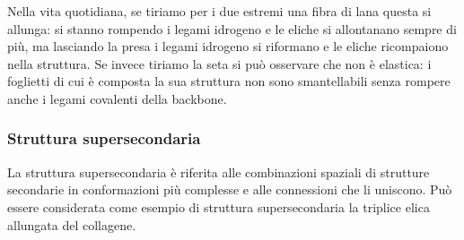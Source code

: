 {{\par Nella vita quotidiana, se tiriamo per i due estremi una fibra di lana questa si allunga: si stanno rompendo i legami idrogeno e le eliche si allontanano sempre di più, ma lasciando la presa i legami idrogeno si riformano e le eliche ricompaiono nella struttura. Se invece tiriamo la seta si può osservare che non è elastica: i foglietti di cui è composta la sua struttura non sono smantellabili senza rompere anche i legami covalenti della backbone.

}
\subsubsection{Struttura supersecondaria}
{
La struttura supersecondaria è riferita alle combinazioni spaziali di strutture secondarie in conformazioni più complesse e alle connessioni che li uniscono. Può essere considerata come esempio di struttura supersecondaria la triplice elica allungata del collagene.

}}
